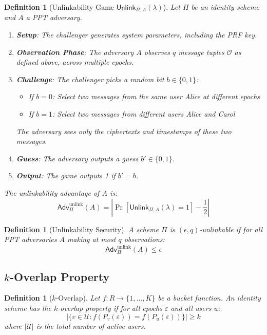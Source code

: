 \documentclass[11pt]{article}
\newtheorem{definition}[theorem]{Definition}
\newcommand{\Adv}{\mathsf{Adv}}
\newcommand{\epoch}{\varepsilon}
\begin{document}
\begin{definition}[Unlinkability Game $\mathsf{Unlink}_{\Pi, A}(\lambda)$]
Let $\Pi$ be an identity scheme and $A$ a PPT adversary.
\begin{enumerate}
    \item \textbf{Setup}: The challenger generates system parameters, including the PRF key.

    \item \textbf{Observation Phase}: The adversary $A$ observes $q$ message tuples
    $\mathcal{O}$ as defined above, across multiple epochs.

    \item \textbf{Challenge}: The challenger picks a random bit $b \in \{0,1\}$:
    \begin{itemize}
        \item If $b = 0$: Select two messages from the \emph{same} user Alice at different epochs
        \item If $b = 1$: Select two messages from \emph{different} users Alice and Carol
    \end{itemize}
    The adversary sees only the ciphertexts and timestamps of these two messages.

    \item \textbf{Guess}: The adversary outputs a guess $b' \in \{0,1\}$.

    \item \textbf{Output}: The game outputs 1 if $b' = b$.
\end{enumerate}

The \emph{unlinkability advantage} of $A$ is:
\[
\Adv^{\text{unlink}}_{\Pi}(A) = \left| \Pr[\mathsf{Unlink}_{\Pi,A}(\lambda) = 1] - \frac{1}{2} \right|
\]
\end{definition}

\begin{definition}[Unlinkability Security]
A scheme $\Pi$ is \emph{$(\epsilon, q)$-unlinkable} if for all PPT adversaries $A$
making at most $q$ observations:
\[
\Adv^{\text{unlink}}_{\Pi}(A) \leq \epsilon
\]
\end{definition}

\subsection{$k$-Overlap Property}

\begin{definition}[$k$-Overlap]
Let $f: R \to \{1, \ldots, K\}$ be a bucket function. An identity scheme has the
\emph{$k$-overlap property} if for all epochs $\epoch$ and all users $u$:
\[
|\{v \in \mathcal{U} : f(P_v(\epoch)) = f(P_u(\epoch))\}| \geq k
\]
where $|\mathcal{U}|$ is the total number of active users.
\end{definition}
\end{document}
